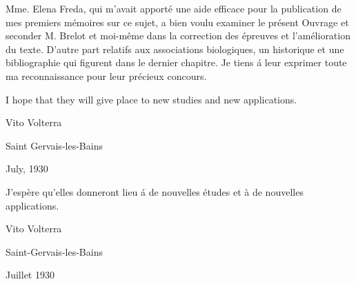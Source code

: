 \documentclass[crop=false,class=book,oneside]{standalone}
\begin{document}
\begin{paracol}{2}
            \switchcolumn
            \foreignlanguage{french}{
            Mme. Elena Freda, qui m'avait apport\'{e} une aide efficace pour la publication de mes premiers m\'{e}moires sur ce sujet, a bien voulu examiner le pr\'{e}sent Ouvrage et seconder M. Brelot et moi-m\^{e}me dans la correction des \'{e}preuves et l'am\'{e}lioration du texte. D'autre part relatifs aux associations biologiques, un historique et une bibliographie qui figurent dans le dernier chapitre. Je tiens \'{a} leur exprimer toute ma reconnaissance pour leur pr\'{e}cieux concours.}
            \par\hfill\par
            \switchcolumn
            I hope that they will give place to new studies and new applications.\par\hfill\par
            Vito Volterra\hfill\par
            Saint Gervais-les-Bains\hfill\par
            July, 1930\par
            \switchcolumn
            \begin{sloppypar}
            J'esp\`{e}re qu'elles donneront lieu \'{a} de nouvelles \'{e}tudes et \`{a} de nouvelles applications.\par\hfill\par
            Vito Volterra\hfill\par
            Saint-Gervais-les-Bains\hfill\par
            Juillet 1930
            \end{sloppypar}
        \end{paracol}
\end{document}
